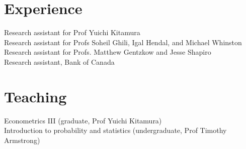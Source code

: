 \documentclass[11pt]{article} %
\begin{document}
\section*{Experience}

 Research assistant for Prof Yuichi Kitamura \\
 Research assistant for Profs Soheil Ghili, Igal Hendal, and Michael Whinston \\
  Research assistant for Profs. Matthew Gentzkow and Jesse Shapiro \\
 Research assistant, Bank of Canada \\

\section*{Teaching}

 Econometrics III (graduate, Prof Yuichi Kitamura) \\
 Introduction to probability and statistics (undergraduate, Prof Timothy Armstrong)



\vfill %
\end{document}
